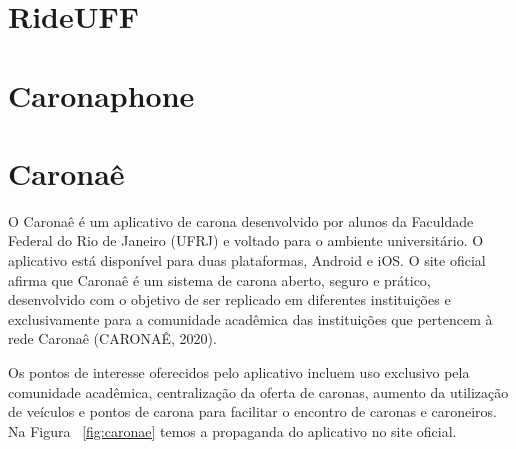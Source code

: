 \section{RideUFF}

\section{Caronaphone}


\section{Caronaê}


O Caronaê é um aplicativo de carona desenvolvido por alunos da Faculdade Federal do Rio de Janeiro (UFRJ) e voltado para o ambiente universitário. O aplicativo está disponível para duas plataformas, Android e iOS. O site oficial afirma que Caronaê é um sistema de carona aberto, seguro e prático, desenvolvido com o objetivo de ser replicado em diferentes instituições e exclusivamente para a comunidade acadêmica das instituições que pertencem à rede Caronaê (CARONAÊ, 2020).

Os pontos de interesse oferecidos pelo aplicativo incluem uso exclusivo pela comunidade acadêmica, centralização da oferta de caronas, aumento da utilização de veículos e pontos de carona para facilitar o encontro de caronas e caroneiros. Na Figura ~\ref{fig:caronae} temos a propaganda do aplicativo no site oficial. %

